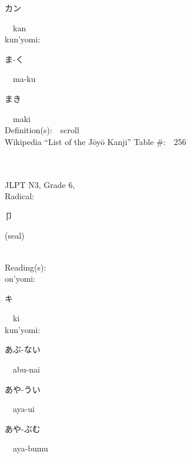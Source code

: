 \begin{multicols}{2}
{\hspace*{2em}}{\begin{CJK}{UTF8}{min} カン \end{CJK}}\ \ kan\ \ \\
{\hspace*{1em}}kun'yomi:\ \ \\
{\hspace*{2em}}{\begin{CJK}{UTF8}{min} ま-く \end{CJK}}\ \ ma-ku\ \ \\
{\hspace*{2em}}{\begin{CJK}{UTF8}{min} まき \end{CJK}}\ \ maki\ \ \\
Definition(s):\ \ scroll \\
Wikipedia ``List of the J\=oy\=o Kanji'' Table \#:\ \ 256 \\
\ \ \\
{\fontsize{34pt}{40pt}  }\ \ \\  %
{JLPT N3, Grade 6, \\Radical:\ \ {\begin{CJK}{UTF8}{min} 卩 \end{CJK}} (seal) } \\
Reading(s):\ \ \\
{\hspace*{1em}}on'yomi:\ \ \\
{\hspace*{2em}}{\begin{CJK}{UTF8}{min} キ \end{CJK}}\ \ ki\ \ \\
{\hspace*{1em}}kun'yomi:\ \ \\
{\hspace*{2em}}{\begin{CJK}{UTF8}{min} あぶ-ない \end{CJK}}\ \ abu-nai\ \ \\
{\hspace*{2em}}{\begin{CJK}{UTF8}{min} あや-うい \end{CJK}}\ \ aya-ui\ \ \\
{\hspace*{2em}}{\begin{CJK}{UTF8}{min} あや-ぶむ \end{CJK}}\ \ aya-bumu\ \ \\

\end{multicols}
